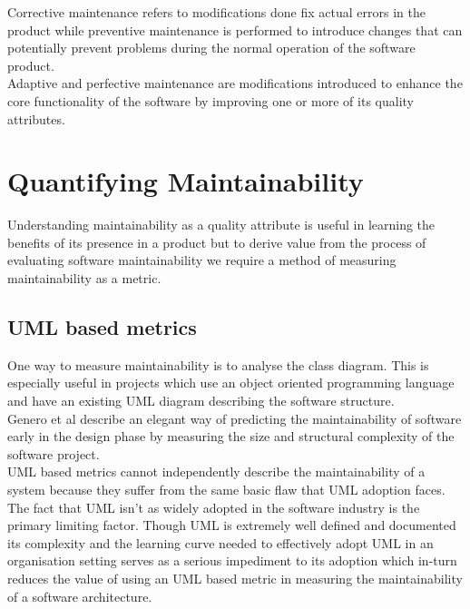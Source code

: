\documentclass[15pt]{article}
\begin{document}
Corrective maintenance refers to modifications done fix actual errors in the product while preventive maintenance is performed to introduce changes that can potentially prevent problems during the normal operation of the software product. \\

Adaptive and perfective maintenance are modifications introduced to enhance the core functionality of the software by improving one or more of its quality attributes. 

\section{Quantifying Maintainability}
Understanding maintainability as a quality attribute is useful in learning the benefits of  its presence in a product but to derive value from the process of evaluating software maintainability we require a method of measuring maintainability as a metric.

\subsection{UML based metrics}
One way to measure maintainability is to analyse the class diagram. This is especially useful in projects which use an object oriented programming language and have an existing UML diagram describing the software structure. \\


Genero et al \cite{genero_building_2003} \cite{genero_building_2007} describe an elegant way of predicting the maintainability of software early in the design phase by measuring the size and structural complexity of the software project. \\

UML based metrics cannot independently describe the maintainability of a system because they suffer from the same basic flaw that UML adoption faces. The fact that UML isn't as widely adopted in the software industry is the primary limiting factor. Though UML is extremely well defined and documented its complexity and the learning curve needed to effectively adopt UML in an organisation setting serves as a serious impediment to its adoption which in-turn reduces the value of using an UML based metric in measuring the maintainability of a software architecture.
\end{document}
